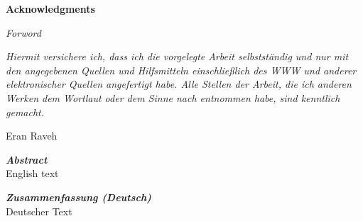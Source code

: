 
\vspace*{9cm}
\begin{center}
\end{center}
\newpage

\vspace*{3cm}
\begin{center}
    {\textbf{\huge Acknowledgments}}\\[0.3cm]
    \Large
\end{center}
\newpage

{\calligra \Huge \textit{Forword}}
\clearpage        

\begin{multicols}{2}
    \vspace*{\textheight}
    \columnbreak
    \vspace*{3cm}
    \Large{\textit{Hiermit versichere ich, dass ich die vorgelegte Arbeit selbstst{\"a}ndig und nur mit den angegebenen Quellen und Hilfsmitteln einschließlich des WWW und anderer elektronischer Quellen angefertigt habe.
            Alle Stellen der Arbeit, die ich anderen Werken dem Wortlaut oder dem Sinne nach entnommen habe, sind kenntlich gemacht.}}
    \vspace{0.55cm}
    \begin{flushright}
		{Eran Raveh}
    \end{flushright}
\end{multicols}
\cleardoublepage

\pagestyle{fancyplain}
\fancyhead{} %
\renewcommand{\headrulewidth}{0pt} %
\cfoot{} %
\fancyfoot[LO,RE]{\thepage} %

\begin{center}
    \vspace*{3.3cm}
    \textit{\textbf{\huge Abstract}}\\[0.3cm]
    \Large
    English text
\end{center}
\clearpage

\begin{center}
     \vspace*{3.3cm}
     \textit{\textbf{\huge Zusammenfassung (Deutsch)}}\\[0.3cm]
     \Large
	 \foreignlanguage{german}{
	 	Deutscher Text
	 }
\end{center}
\cleardoublepage

